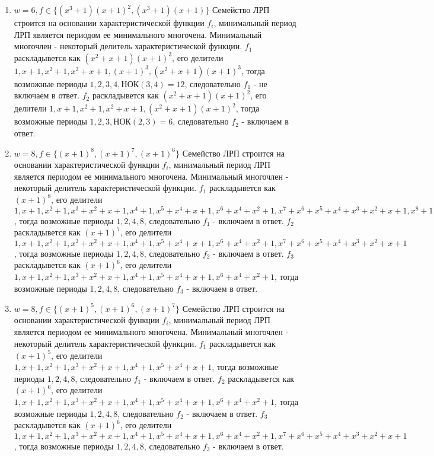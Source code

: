 \documentclass[utf8x, 14pt]{G7-32} %
\begin{document}
\begin{enumerate}
    \item $w=6, f\in \{(x^3+1)(x+1)^2, (x^3+1)(x+1)\}$
    Семейство ЛРП строится на основании характеристической функции $f_i$, минимальный период ЛРП является периодом ее минимального многочена. Минимальный многочлен - некоторый делитель характеристической функции. $f_1$ раскладывется как $(x^2+x+1)(x+1)^3$, его делители $1, x+1, x^2+1, x^2+x+1, (x+1)^3, (x^2+x+1)(x+1)^3$, тогда возможные периоды $1, 2, 3, 4, $НОК$(3,4)=12$, следовательно $f_1$ - не включаем в ответ. $f_2$ раскладывется как $(x^2+x+1)(x+1)^2$, его делители $1, x+1, x^2+1, x^2+x+1, (x^2+x+1)(x+1)^2$, тогда возможные периоды $1, 2, 3, $НОК$(2,3)=6$, следовательно $f_2$ - включаем в ответ.
    
    \item $w=8, f\in \{(x+1)^8, (x+1)^7, (x+1)^6\}$
    Семейство ЛРП строится на основании характеристической функции $f_i$, минимальный период ЛРП является периодом ее минимального многочена. Минимальный многочлен - некоторый делитель характеристической функции. $f_1$ раскладывется как $(x+1)^8$, его делители $1, x+1, x^2+1, x^3+x^2+x+1, x^4+1, x^5+x^4+x+1, x^6+x^4+x^2+1, x^7+x^6+x^5+x^4+x^3+x^2+x+1, x^8+1$, тогда возможные периоды $1, 2, 4, 8$, следовательно $f_1$ - включаем в ответ. $f_2$ раскладывется как $(x+1)^7$, его делители $1, x+1, x^2+1, x^3+x^2+x+1, x^4+1, x^5+x^4+x+1, x^6+x^4+x^2+1, x^7+x^6+x^5+x^4+x^3+x^2+x+1$, тогда возможные периоды $1, 2, 4, 8$, следовательно $f_2$ - включаем в ответ. $f_3$ раскладывется как $(x+1)^6$, его делители $1, x+1, x^2+1, x^3+x^2+x+1, x^4+1, x^5+x^4+x+1, x^6+x^4+x^2+1$, тогда возможные периоды $1, 2, 4, 8$, следовательно $f_3$ - включаем в ответ.
    
    \item $w=8, f\in \{(x+1)^5, (x+1)^6, (x+1)^7\}$
    Семейство ЛРП строится на основании характеристической функции $f_i$, минимальный период ЛРП является периодом ее минимального многочена. Минимальный многочлен - некоторый делитель характеристической функции. $f_1$ раскладывется как $(x+1)^5$, его делители $1, x+1, x^2+1, x^3+x^2+x+1, x^4+1, x^5+x^4+x+1$, тогда возможные периоды $1, 2, 4, 8$, следовательно $f_1$ - включаем в ответ. $f_2$ раскладывется как $(x+1)^6$, его делители $1, x+1, x^2+1, x^3+x^2+x+1, x^4+1, x^5+x^4+x+1, x^6+x^4+x^2+1$, тогда возможные периоды $1, 2, 4, 8$, следовательно $f_2$ - включаем в ответ. $f_3$ раскладывется как $(x+1)^6$, его делители $1, x+1, x^2+1, x^3+x^2+x+1, x^4+1, x^5+x^4+x+1, x^6+x^4+x^2+1, x^7+x^6+x^5+x^4+x^3+x^2+x+1$, тогда возможные периоды $1, 2, 4, 8$, следовательно $f_3$ - включаем в ответ.
\end{enumerate}
\end{document}
